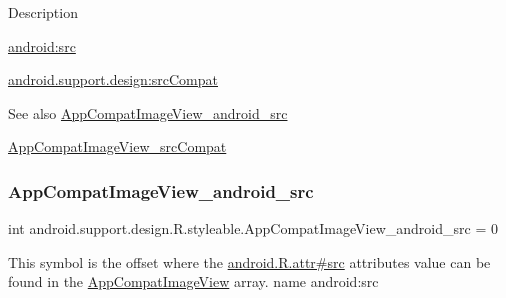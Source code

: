 Description 

{\ttfamily \hyperlink{classandroid_1_1support_1_1design_1_1R_1_1styleable_a3497943f12dbcc3cd4d6b241872b3035}{android\+:src}}

{\ttfamily \hyperlink{classandroid_1_1support_1_1design_1_1R_1_1styleable_a1776714cccff6963241afa595ebb669d}{android.\+support.\+design\+:src\+Compat}}

\begin{DoxySeeAlso}{See also}
\hyperlink{classandroid_1_1support_1_1design_1_1R_1_1styleable_a3497943f12dbcc3cd4d6b241872b3035}{App\+Compat\+Image\+View\+\_\+android\+\_\+src} 

\hyperlink{classandroid_1_1support_1_1design_1_1R_1_1styleable_a1776714cccff6963241afa595ebb669d}{App\+Compat\+Image\+View\+\_\+src\+Compat} 
\end{DoxySeeAlso}
\mbox{\label{classandroid_1_1support_1_1design_1_1R_1_1styleable_a3497943f12dbcc3cd4d6b241872b3035}} 
\subsubsection{\texorpdfstring{App\+Compat\+Image\+View\+\_\+android\+\_\+src}{AppCompatImageView\_android\_src}}
{\footnotesize\ttfamily int android.\+support.\+design.\+R.\+styleable.\+App\+Compat\+Image\+View\+\_\+android\+\_\+src = 0\hspace{0.3cm}{\ttfamily [static]}}

This symbol is the offset where the \hyperlink{}{android.\+R.\+attr\#src} attribute\textquotesingle{}s value can be found in the \hyperlink{classandroid_1_1support_1_1design_1_1R_1_1styleable_ada1b5e4475936c9e01181fdb4d8cb6c9}{App\+Compat\+Image\+View} array.  name android\+:src \mbox{\label{classandroid_1_1support_1_1design_1_1R_1_1styleable_a1776714cccff6963241afa595ebb669d}} 
